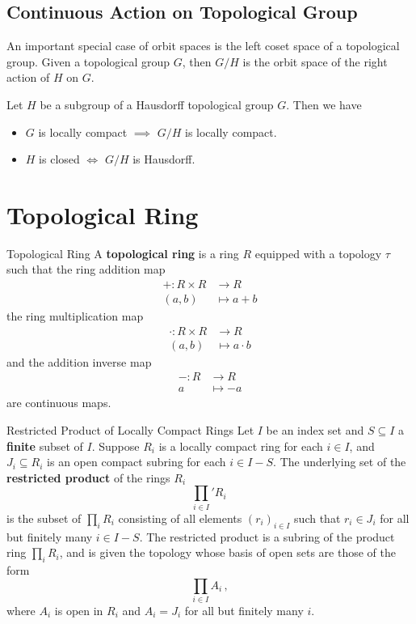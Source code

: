 \documentclass{report}
\begin{document}
\subsection{Continuous Action on Topological Group}
An important special case of orbit spaces is the left coset space of a topological group. Given a topological group $G$, then $G/H$ is the orbit space of the right action of $H$ on $G$.

\begin{proposition}{}{}
	Let $H$ be a subgroup of a Hausdorff topological group $G$. Then we have
	\begin{itemize}
		\item $G$ is locally compact $\implies$ $G/H$ is locally compact.
		\item $H$ is closed $\iff$ $G/H$ is Hausdorff.
	\end{itemize}
\end{proposition}

\section{Topological Ring}
\begin{definition}{Topological Ring}{}
	A \textbf{topological ring} is a ring $R$ equipped with a topology $\tau$ such that the ring addition map
	\begin{align*}
		+:R\times R & \longrightarrow R \\
		(a,b)       & \longmapsto a+b
	\end{align*}
	the ring multiplication map
	\begin{align*}
		\cdot:R\times R & \longrightarrow R    \\
		(a,b)           & \longmapsto a\cdot b
	\end{align*}
	and the addition inverse map
	\begin{align*}
		-:R & \longrightarrow R \\
		a   & \longmapsto -a
	\end{align*}
	are continuous maps.
\end{definition}

\begin{definition}{Restricted Product of Locally Compact Rings}{}
	Let \( I \) be an index set and \( S\subseteq I \) a \textbf{finite} subset of \( I \). Suppose \( R_i \) is a locally compact ring for each \( i \in I \), and \( J_i \subseteq R_i \) is an open compact subring for each \( i \in I - S \). The underlying set of the \textbf{restricted product} of the rings \( R_i \)  
	\[
		\prod_{i\in I}' R_i\,
	\]
	is the subset of $\prod_i R_i$ consisting of all elements \( (r_i)_{i \in I} \) such that \( r_i \in J_i \) for all but finitely many \( i \in I - S \). The restricted product is a subring of the product ring $\prod_i R_i$, and is given the topology whose basis of open sets are those of the form
	\[
		\prod_{i\in I} A_i\,,
	\]
	where \( A_i \) is open in \( R_i \) and \( A_i = J_i \) for all but finitely many \( i \).
\end{definition}
\end{document}
